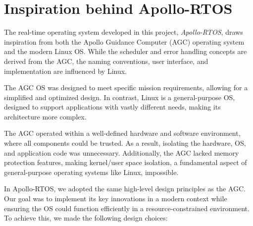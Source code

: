 \section{Inspiration behind Apollo-RTOS}

The real-time operating system developed in this project, \textit{Apollo-RTOS}, draws
inspiration from both the Apollo Guidance Computer (AGC) operating system and the
modern Linux OS. While the scheduler and error handling concepts are derived from the
AGC, the naming conventions, user interface, and implementation are influenced by
Linux.

The AGC OS was designed to meet specific mission requirements, allowing for a
simplified and optimized design. In contrast, Linux is a general-purpose OS, designed
to support applications with vastly different needs, making its architecture more
complex.

The AGC operated within a well-defined hardware and software environment, where all
components could be trusted. As a result, isolating the hardware, OS, and application
code was unnecessary. Additionally, the AGC lacked memory protection features, making
kernel/user space isolation, a fundamental aspect of general-purpose operating systems
like Linux, impossible.

In Apollo-RTOS, we adopted the same high-level design principles as the AGC. Our goal
was to implement its key innovations in a modern context while ensuring the OS could
function efficiently in a resource-constrained environment. To achieve this, we made
the following design choices:

